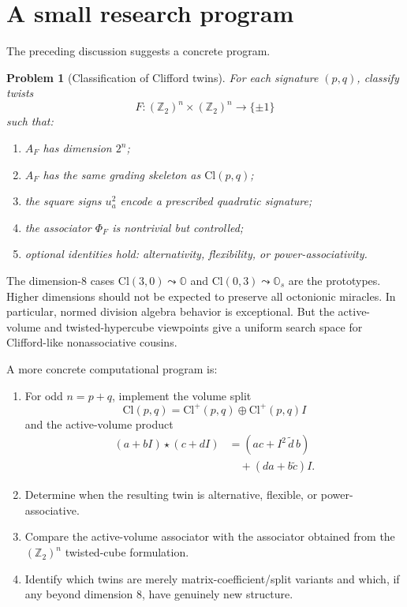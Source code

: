 \documentclass[11pt]{article}
\newtheorem{problem}{Problem}
\newcommand{\Ztwo}{\mathbb Z_2}
\newcommand{\Cl}{\mathrm{Cl}}
\newcommand{\assoc}{\Phi}
\begin{document}
\section{A small research program}

The preceding discussion suggests a concrete program.

\begin{problem}[Classification of Clifford twins]
For each signature $(p,q)$, classify twists
\[
F:(\Ztwo)^n\times(\Ztwo)^n\to \{\pm 1\}
\]
such that:
\begin{enumerate}
    \item $A_F$ has dimension $2^n$;
    \item $A_F$ has the same grading skeleton as $\Cl(p,q)$;
    \item the square signs $u_a^2$ encode a prescribed quadratic signature;
    \item the associator $\assoc_F$ is nontrivial but controlled;
    \item optional identities hold: alternativity, flexibility, or power-associativity.
\end{enumerate}
\end{problem}

The dimension-$8$ cases $\Cl(3,0)\leadsto\mathbb O$ and
$\Cl(0,3)\leadsto\mathbb O_s$ are the prototypes. Higher dimensions should
not be expected to preserve all octonionic miracles. In particular, normed
division algebra behavior is exceptional. But the active-volume and
twisted-hypercube viewpoints give a uniform search space for Clifford-like
nonassociative cousins.

A more concrete computational program is:
\begin{enumerate}
    \item For odd $n=p+q$, implement the volume split
    \[
    \Cl(p,q)=\Cl^+(p,q)\oplus\Cl^+(p,q)I
    \]
    and the active-volume product
    \[
    \begin{aligned}
    (a+bI)\star(c+dI)
    &=(ac+I^2\,\widetilde d\,b)\\
    &\quad +(da+b\widetilde c)I.
    \end{aligned}
    \]
    \item Determine when the resulting twin is alternative, flexible, or
    power-associative.
    \item Compare the active-volume associator with the associator obtained
    from the $(\Ztwo)^n$ twisted-cube formulation.
    \item Identify which twins are merely matrix-coefficient/split variants
    and which, if any beyond dimension $8$, have genuinely new structure.
\end{enumerate}
\end{document}
